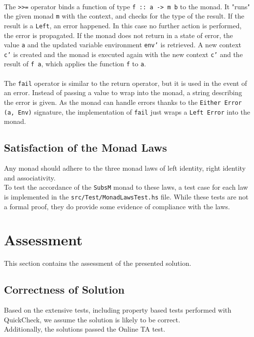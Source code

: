 \documentclass[11pt, a4paper]{article}
\begin{document}
\paragraph{}
The \texttt{>>=} operator binds a function of type \texttt{f :: a -> m b} to the monad. It "runs" the given monad \texttt{m} with the context, and checks for the type of the result. If the result is a \texttt{Left}, an error happened. In this case no further action is performed, the error is propagated.
If the monad does not return in a state of error, the value \texttt{a} and the updated variable environment \texttt{env'} is retrieved. A new context \texttt{c'} is created and the monad is executed again with the new context \texttt{c'} and the result of \texttt{f a}, which applies the function \texttt{f} to \texttt{a}.

\paragraph{}
The \texttt{fail} operator is similar to the return operator, but it is used in the event of an error. Instead of passing a value to wrap into the monad, a string describing the error is given. As the monad can handle errors thanks to the \texttt{Either Error (a, Env)} signature, the implementation of \texttt{fail} just wraps a \texttt{Left Error} into the monad.

\subsection{Satisfaction of the Monad Laws}
Any monad should adhere to the three monad laws of left identity, right identity and associativity.
\\
To test the accordance of the \texttt{SubsM} monad to these laws, a test case for each law is implemented in the \texttt{src/Test/MonadLawsTest.hs} file. While these tests are not a formal proof, they do provide some evidence of compliance with the laws.


\pagebreak
\section{Assessment}
This section contains the assessment of the presented solution.


\subsection{Correctness of Solution}
Based on the extensive tests, including property based tests performed with QuickCheck, we assume the solution is likely to be correct.
\\
Additionally, the solutions passed the Online TA test.
\end{document}
